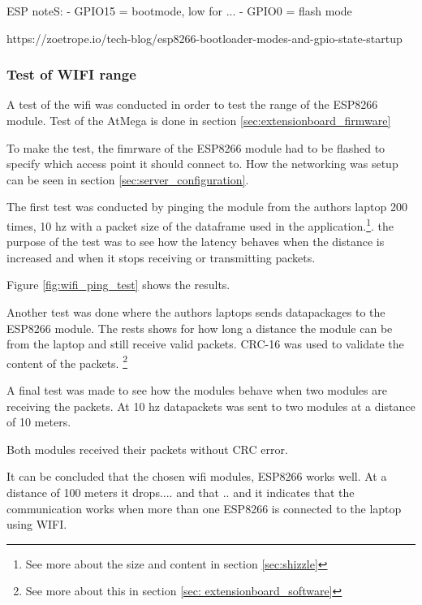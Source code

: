 ESP noteS:
 - GPIO15 = bootmode, low for ...
 - GPIO0 = flash mode
 
 
 https://zoetrope.io/tech-blog/esp8266-bootloader-modes-and-gpio-state-startup

\subsubsection{Test of WIFI range}
A test of the wifi was conducted in order to test the range of the ESP8266 module. Test of the AtMega is done in section \ref{sec:extensionboard_firmware}

To make the test, the fimrware of the ESP8266 module had to be flashed to specify which access point it should connect to. How the networking was setup can be seen in section \ref{sec:server_configuration}.

The first test was conducted by pinging the module from the authors laptop 200 times, 10 hz with a packet size of the dataframe used in the application.\footnote{See more about the size and content in section \ref{sec:shizzle}}. the purpose of the test was to see how the latency behaves when the distance is increased and when it stops receiving or transmitting packets.

Figure \ref{fig:wifi_ping_test} shows the results.


Another test was done where the authors laptops sends datapackages to the ESP8266 module. The rests shows for how long a distance the module can be from the laptop and still receive valid packets. CRC-16 was used to validate the content of the packets. \footnote{See more about this in section \ref{sec: extensionboard_software}}




A final test was made to see how the modules behave when two modules are receiving the packets. At 10 hz datapackets was sent to two modules at a distance of 10 meters.

Both modules received their packets without CRC error.

It can be concluded that the chosen wifi modules, ESP8266 works well. At a distance of 100 meters it drops.... and that .. and it indicates that the communication works when more than one ESP8266 is connected to the laptop using WIFI.

